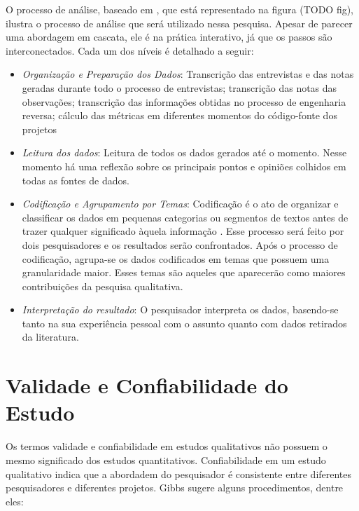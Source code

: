 O processo de análise, baseado em \cite{creswell}, que está representado na figura (TODO fig), ilustra o processo de análise que será utilizado nessa pesquisa. Apesar de parecer uma abordagem em cascata, ele é na prática interativo, já que os passos são interconectados. Cada um dos níveis é detalhado a seguir:

\begin{itemize}

	\item \textit{Organização e Preparação dos Dados}: Transcrição das entrevistas e das notas geradas durante todo o processo de entrevistas; transcrição das notas das observações; transcrição das informações obtidas no processo de engenharia reversa; cálculo das métricas em diferentes momentos do código-fonte dos projetos
	
	\item \textit{Leitura dos dados}: Leitura de todos os dados gerados até o momento. Nesse momento há uma reflexão sobre os principais pontos e opiniões colhidos em todas as fontes de dados.
	
	\item \textit{Codificação e Agrupamento por Temas}:	Codificação é o ato de organizar e classificar os dados em pequenas categorias ou segmentos de textos antes de trazer qualquer significado àquela informação \cite{rossman}. Esse processo será feito por dois pesquisadores e os resultados serão confrontados. Após o processo de codificação, agrupa-se os dados codificados em temas que possuem uma granularidade maior. Esses temas são aqueles que aparecerão como maiores contribuições da pesquisa qualitativa.
	
	\item \textit{Interpretação do resultado}: O pesquisador interpreta os dados, basendo-se tanto na sua experiência pessoal com o assunto quanto com dados retirados da literatura.

\end{itemize}
 

\section{Validade e Confiabilidade do Estudo}
\label{sec:planejamento-validacao}

Os termos validade e confiabilidade em estudos qualitativos não possuem o mesmo significado dos estudos quantitativos. 
Confiabilidade em um estudo qualitativo indica que a abordadem do pesquisador é consistente entre diferentes pesquisadores
e diferentes projetos. Gibbs \cite{gibbs} sugere alguns procedimentos, dentre eles:

